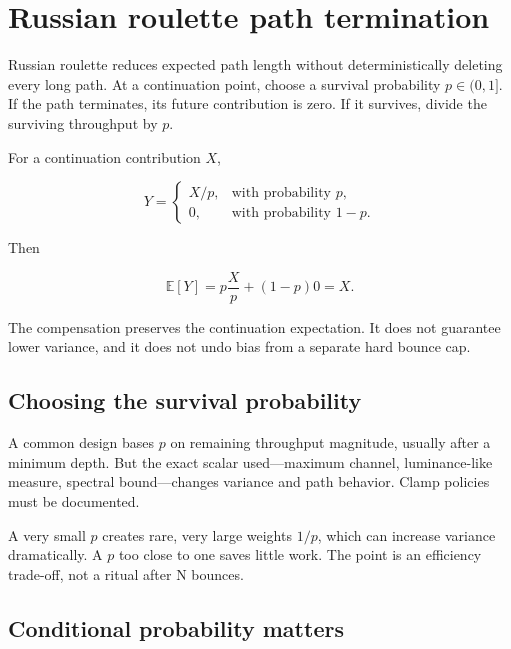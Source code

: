 \hypertarget{appendix-7277c62d4599}{}\label{referencestart:appendix-7277c62d4599}
\section{Russian roulette path termination}\label{appendix-7277c62d4599-russian-roulette-path-termination}

\hypertarget{appendix-7277c62d4599-russian-roulette-path-termination}{}

Russian roulette reduces expected path length without deterministically deleting every long path. At a continuation point, choose a survival probability \(p\in(0,1]\). If the path terminates, its future contribution is zero. If it survives, divide the surviving throughput by \(p\).

For a continuation contribution \(X\),

\[
Y=
\begin{cases}
X/p,&\text{with probability }p,\\
0,&\text{with probability }1-p.
\end{cases}
\]

Then

\[
\mathbb E[Y]
=
p\frac{X}{p}+(1-p)0
=
X.
\]

The compensation preserves the continuation expectation. It does not guarantee lower variance, and it does not undo bias from a separate hard bounce cap.

\subsection{Choosing the survival probability}\label{appendix-7277c62d4599-choosing-the-survival-probability}

\hypertarget{appendix-7277c62d4599-choosing-the-survival-probability}{}

A common design bases \(p\) on remaining throughput magnitude, usually after a minimum depth. But the exact scalar used---maximum channel, luminance-like measure, spectral bound---changes variance and path behavior. Clamp policies must be documented.

A very small \(p\) creates rare, very large weights \(1/p\), which can increase variance dramatically. A \(p\) too close to one saves little work. The point is an efficiency trade-off, not a ritual after N bounces.

\subsection{Conditional probability matters}\label{appendix-7277c62d4599-conditional-probability-matters}

